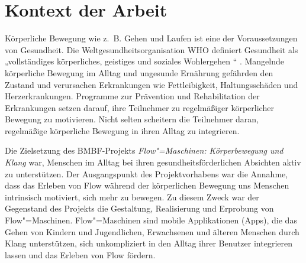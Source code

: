 

\section{Kontext der Arbeit} 

\label{sec:kontext_der_arbeit}

Körperliche Bewegung wie z.~B. Gehen und Laufen ist eine der Voraussetzungen von Gesundheit. Die Weltgesundheitsorganisation \acs{WHO} definiert Gesundheit als „vollständiges körperliches, geistiges und soziales Wohlergehen \textellipsis“ \citep[S.~100]{WorldHealthOrganization1948}. Mangelnde körperliche Bewegung im Alltag und ungesunde Ernährung gefährden den Zustand und verursachen Erkrankungen wie Fettleibigkeit, Haltungsschäden und Herzerkrankungen. Programme zur Prävention und Rehabilitation der Erkrankungen setzen darauf, ihre Teilnehmer zu regelmäßiger körperlicher Bewegung zu motivieren. Nicht selten scheitern die Teilnehmer daran, regelmäßige körperliche Bewegung in ihren Alltag zu integrieren.

Die Zielsetzung des \acs{BMBF}-Projekts \emph{Flow"=Maschinen: Körperbewegung und Klang} war, Menschen im Alltag bei ihren gesundheitsförderlichen Absichten aktiv zu unterstützen. Der Ausgangspunkt des Projektvorhabens war die Annahme, dass das Erleben von Flow während der körperlichen Bewegung uns Menschen intrinsisch motiviert, sich mehr zu bewegen. Zu diesem Zweck war der Gegenstand des Projekts die Gestaltung, Realisierung und Erprobung von Flow"=Maschinen. Flow"=Maschinen sind mobile Applikationen (Apps), die das Gehen von Kindern und Jugendlichen, Erwachsenen und älteren Menschen durch Klang unterstützen, sich unkompliziert in den Alltag ihrer Benutzer integrieren lassen und das Erleben von Flow fördern.

